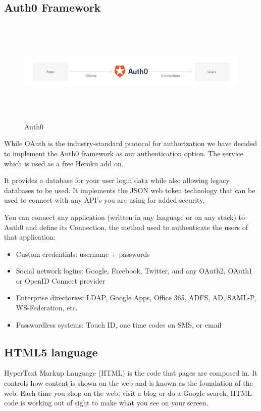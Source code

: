 \subsection{Auth0 Framework}
\begin{figure}
      \caption{Auth0 \cite{auth0}}
      \centering
      \includegraphics[width=13.5cm, height=5cm]{img/auth0.png}
\end{figure}
While OAuth is the industry-standard protocol for authorization we have decided to implement the Auth0 framework as our authentication option. The service which is used as a free Heroku add on.

It provides a database for your user login data while also allowing legacy databases to be used. It implements the JSON web token technology that can be used to connect with any API's you are using for added security.



You can connect any application (written in any language or on any stack) to Auth0 and define its Connection, the method used to authenticate the users of that application:\cite{auth0}
\begin{itemize}
\item Custom credentials: username + passwords \cite{auth0}
\item Social network logins: Google, Facebook, Twitter, and any OAuth2,  OAuth1 or OpenID Connect provider \cite{auth0}
\item Enterprise directories: LDAP, Google Apps, Office 365, ADFS, AD, SAML-P, WS-Federation, etc. \cite{auth0}
\item Passwordless systems: Touch ID, one time codes on SMS, or email \cite{auth0}
\end{itemize}

\subsection{HTML5 language}
HyperText Markup Language (HTML) is the code that pages are composed in.\cite{html2} It controls how content is shown on the web and is known as the foundation of the web. Each time you shop on the web, visit a blog or do a Google search, HTML code is working out of sight to make what you see on your screen.\cite{html2}

